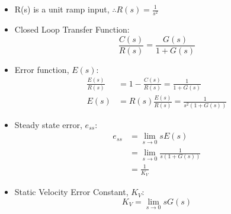 \documentclass[a4paper]{article}
\begin{document}
\begin{itemize}
    \item R(s) is a unit ramp input, $\therefore R(s) = \displaystyle\frac{1}{s^2}$
    \item Closed Loop Transfer Function:
    $$\frac{C(s)}{R(s)} = \frac{G(s)}{1+G(s)}$$
    \item Error function, $E(s)$:
    \begin{align*}
        \frac{E(s)}{R(s)} &= 1-\frac{C(s)}{R(s)} = \frac{1}{1+G(s)}\\
        E(s) &= R(s)\frac{E(s)}{R(s)} = \frac{1}{s^2(1+G(s))}
    \end{align*}
    \item Steady state error, $e_{ss}$:
    \begin{align*}
        e_{ss} &= \lim_{s\to 0}sE(s)\\
        &= \lim_{s\to 0}\frac{1}{s(1+G(s))}\\
        &= \frac{1}{K_V}
    \end{align*}
    \item Static Velocity Error Constant, $K_V$:
    $$K_V = \lim_{s\to 0}sG(s)$$
\end{itemize}
\end{document}
